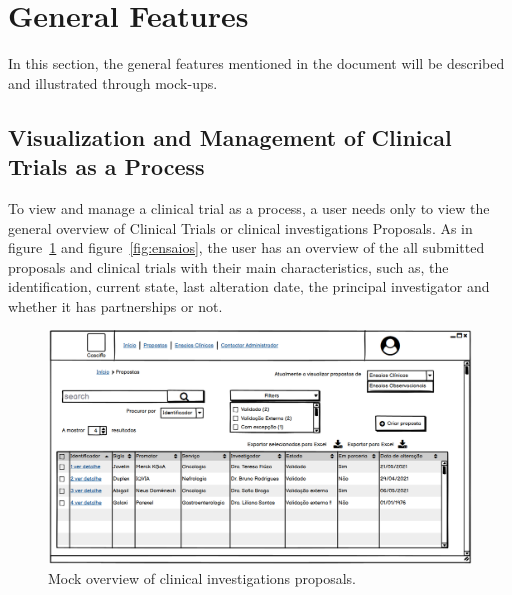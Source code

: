 \section{General Features}
\label{sec:general-features}
In this section, the general features mentioned in the document will be described and illustrated through mock-ups.

\subsection{Visualization and Management of Clinical Trials as a Process}
\label{subsec:visualization-clinical-trials-as-process}
To view and manage a clinical trial as a process, a user needs only to view the general overview of Clinical Trials or clinical investigations Proposals.
As in figure~\ref{fig:propostas} and figure~\ref{fig:ensaios}, the user has an overview of the all submitted proposals and clinical trials with their main characteristics, such as, the identification, current state, last alteration date, the principal investigator and whether it has partnerships or not.

\begin{figure}[H]
    \centering
    \includegraphics[scale=0.35]{images/proposals.png}
    \caption{Mock overview of clinical investigations proposals.}
    \label{fig:propostas}
\end{figure}

